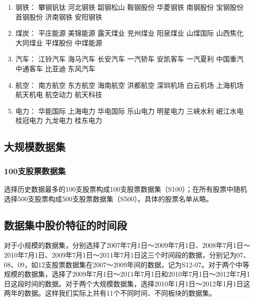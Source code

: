 \documentclass[12pt]{article}
\begin{document}
\begin{multicols}{2}
\begin{enumerate}
\item 钢铁：
 攀钢钒钛
 河北钢铁
 韶钢松山
 鞍钢股份
 华菱钢铁
 南钢股份
 宝钢股份
 首钢股份
 济南钢铁
 安阳钢铁
\item 煤炭：
 平庄能源
 美锦能源
 露天煤业
 兖州煤业
 阳泉煤业
 山煤国际
 山西焦化
 大同煤业
 平煤股份
 中煤能源
\item 汽车：
 江铃汽车
 海马汽车
 长安汽车
 一汽轿车
 安凯客车
 一汽夏利
 中国重汽
 中通客车
 比亚迪
 东风汽车
\item 航空：
 南方航空
 东方航空
 海南航空
 洪都航空
 深圳机场
 白云机场
 上海机场
 航天机电
 航空动力
 航天科技
\item 电力：
 华能国际
 上海电力
 华电国际
 乐山电力
 明星电力
 三峡水利
 岷江水电
 桂冠电力
 九龙电力
 桂东电力
\end{enumerate}
\end{multicols}

\subsection{大规模数据集}
\subsubsection{100支股票数据集}
选择历史数据最多的100支股票构成100支股票数据集（S100）；在所有股票中随机选择500支股票构成500支股票数据集（S500）。具体的股票名单从略。

\subsection{数据集中股价特征的时间段}
对于小规模的数据集，分别选择了2007年7月1日～2009年7月1日、2008年7月1日～2010年7月1日、2009年7月1日～2011年7月1日这三个时间段的数据，分别记为07、08、09，如12支股票数据集在2007～2009年间的数据，记为S12-07。对于两个中等规模的数据集，选择了2009年7月1日～2011年7月1日和2010年7月1日～2012年7月1日这段时间的数据。对于两个大规模数据集，选择2010年1月1日～2012年1月1日这两年的数据。这样我们实际上共有11个不同时间、不同板块的数据集。
\end{document}
